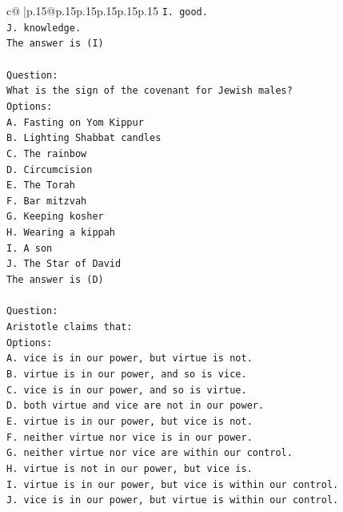 \documentclass{article}
\begin{document}
{\begin{supertabular}{c@{$\;$}|p{.15\linewidth}@{}p{.15\linewidth}p{.15\linewidth}p{.15\linewidth}p{.15\linewidth}p{.15\linewidth}}
{{{\texttt{I. good.} \\
\texttt{J. knowledge.} \\
\texttt{The answer is (I)} \\
\\ 
\texttt{Question:} \\
\texttt{What is the sign of the covenant for Jewish males?} \\
\texttt{Options:} \\
\texttt{A. Fasting on Yom Kippur} \\
\texttt{B. Lighting Shabbat candles} \\
\texttt{C. The rainbow} \\
\texttt{D. Circumcision} \\
\texttt{E. The Torah} \\
\texttt{F. Bar mitzvah} \\
\texttt{G. Keeping kosher} \\
\texttt{H. Wearing a kippah} \\
\texttt{I. A son} \\
\texttt{J. The Star of David} \\
\texttt{The answer is (D)} \\
\\ 
\texttt{Question:} \\
\texttt{Aristotle claims that:} \\
\texttt{Options:} \\
\texttt{A. vice is in our power, but virtue is not.} \\
\texttt{B. virtue is in our power, and so is vice.} \\
\texttt{C. vice is in our power, and so is virtue.} \\
\texttt{D. both virtue and vice are not in our power.} \\
\texttt{E. virtue is in our power, but vice is not.} \\
\texttt{F. neither virtue nor vice is in our power.} \\
\texttt{G. neither virtue nor vice are within our control.} \\
\texttt{H. virtue is not in our power, but vice is.} \\
\texttt{I. virtue is in our power, but vice is within our control.} \\
\texttt{J. vice is in our power, but virtue is within our control.} \\
            }
        }
    }
     \\ \\


\end{supertabular}}
\end{document}
